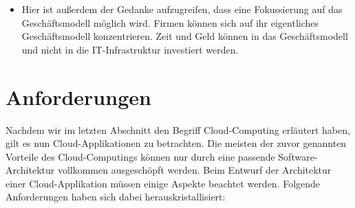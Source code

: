 \begin{itemize}
  \item Hier ist außerdem der Gedanke aufzugreifen, dass eine Fokussierung auf das Geschäftsmodell möglich wird. Firmen können sich auf ihr eigentliches Geschäftsmodell konzentrieren. Zeit und Geld können in das Geschäftsmodell und nicht in die IT-Infrastruktur investiert werden.
\end{itemize}

\section{Anforderungen}\label{grundlagen_anforderungen}
Nachdem wir im letzten Abschnitt den Begriff Cloud-Computing erläutert haben, gilt es nun Cloud-Applikationen zu betrachten. Die meisten der zuvor genannten Vorteile des Cloud-Computings können nur durch eine passende Software-Architektur vollkommen ausgeschöpft werden. Beim Entwurf der Architektur einer Cloud-Applikation müssen einige Aspekte beachtet werden. Folgende Anforderungen haben sich dabei herauskristallisiert:
